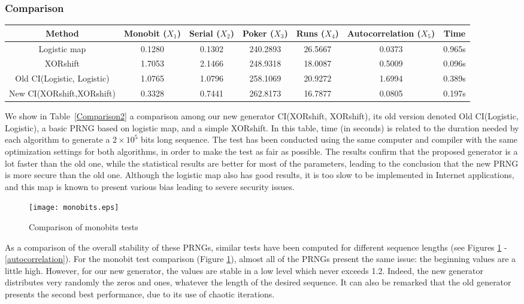 \documentclass[journal]{IEEEtran}
\begin{document}
\subsubsection{Comparison}
\begin{table*}[!t]
\renewcommand{\arraystretch}{1.3}
\caption{Comparison with Old CI(Logistic, Logistic) for a $2 \times 10^5$ bits sequence}
\label{Comparison2}
\centering
\begin{tabular}{ccccccc}
\hline
Method & Monobit ($X_1$)& Serial ($X_2$)& Poker ($X_3$)& Runs ($X_4$)& Autocorrelation ($X_5$)& Time \\ \hline
Logistic map &0.1280&0.1302&240.2893&26.5667&0.0373&0.965s \\
XORshift &1.7053&2.1466&248.9318&18.0087&0.5009&0.096s \\
Old CI(Logistic, Logistic) &1.0765&1.0796&258.1069&20.9272&1.6994&0.389s \\
New CI(XORshift,XORshift) &0.3328&0.7441&262.8173&16.7877&0.0805&0.197s\\
\hline
\end{tabular}
\end{table*}
We show in Table~\ref{Comparison2} a comparison among our new generator CI(XORshift, XORshift), its old version denoted Old CI(Logistic, Logistic), a basic PRNG based on logistic map, and a simple XORshift. In this table, time (in seconds) is related to the duration needed by each algorithm to generate a $2 \times 10^5$ bits long sequence. The test has been conducted using the same computer and compiler with the same optimization settings for both algorithms, in order to make the test as fair as possible. The results confirm that the proposed generator is a lot faster than the old one, while the statistical results are better for most of the parameters, leading to the conclusion that the new PRNG is more secure than the old one. Although the logistic map also has good results, it is too slow to be implemented in Internet applications, and this map is known to present various bias leading to severe security issues.


\begin{figure}
\centering
\texttt{[image: monobits.eps]}
\caption{Comparison of monobits tests}
\label{monobits}
\end{figure}

As a comparison of the overall stability of these PRNGs, similar tests have been computed for different sequence lengths (see Figures \ref{monobits} - \ref{autocorrelation}).
For the monobit test comparison (Figure \ref{monobits}), almost all of the PRNGs present the same issue: the beginning values are a little high. However, for our new generator, the values are stable in a low level which never exceeds 1.2. Indeed, the new generator distributes very randomly the zeros and ones, whatever the length of the desired sequence. 
It can also be remarked that the old generator presents the second best performance, due to its use of chaotic iterations.
\end{document}
